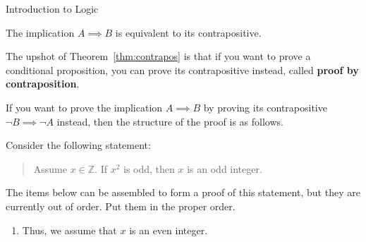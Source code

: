 \begin{section}{Introduction to Logic}
\begin{theorem}\label{thm:contrapos}
The implication ${A\implies B}$ is equivalent to its contrapositive.
\end{theorem}

The upshot of Theorem~\ref{thm:contrapos} is that if you want to prove a conditional proposition, you can prove its contrapositive instead, called \textbf{proof by contraposition}.

\begin{skeleton}\label{pf by contraposition}
If you want to prove the implication $A\implies B$ by proving its contrapositive $\neg B\implies \neg A$ instead, then the structure of the proof is as follows.

\begin{center}
\end{center}
\end{skeleton}

\begin{problem}
Consider the following statement:
\begin{quote}
Assume $x\in\mathbb{Z}$. If $x^2$ is odd, then $x$ is an odd integer.
\end{quote}
The items below can be assembled to form a proof of this statement, but they are currently out of order.  Put them in the proper order.
\begin{enumerate}
\item Thus, we assume that $x$ is an even integer.


\end{enumerate}
\end{problem}
\end{section}
